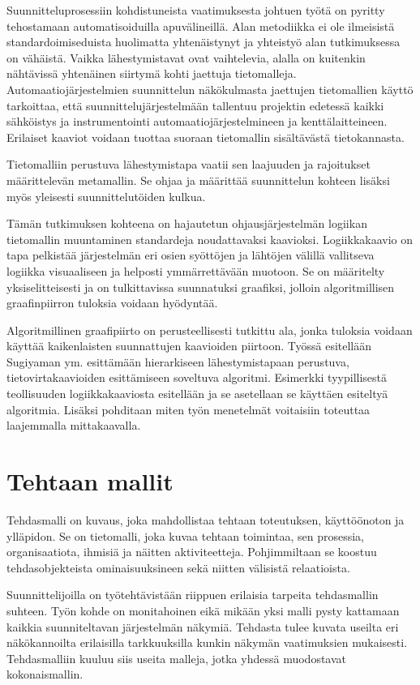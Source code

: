 \documentclass[finnish,12pt]{article}
\begin{document}
Suunnitteluprosessiin kohdistuneista vaatimuksesta johtuen työtä on pyritty tehostamaan automatisoiduilla apuvälineillä.
Alan metodiikka ei ole ilmeisistä standardoimiseduista huolimatta yhtenäistynyt ja yhteistyö alan tutkimuksessa on vähäistä.
Vaikka lähestymistavat ovat vaihtelevia, alalla on kuitenkin nähtävissä yhtenäinen siirtymä kohti jaettuja tietomalleja.
Automaatiojärjestelmien suunnittelun näkökulmasta jaettujen tietomallien käyttö tarkoittaa,
että suunnittelujärjestelmään tallentuu projektin edetessä kaikki sähköistys ja instrumentointi automaatiojärjestelmineen ja kenttälaitteineen.
Erilaiset kaaviot voidaan tuottaa suoraan tietomallin sisältävästä tietokannasta.

Tietomalliin perustuva lähestymistapa vaatii sen laajuuden ja rajoitukset määrittelevän metamallin.
Se ohjaa ja määrittää suunnittelun kohteen lisäksi myös yleisesti suunnittelutöiden kulkua.

Tämän tutkimuksen kohteena on hajautetun ohjausjärjestelmän logiikan tietomallin muuntaminen standardeja noudattavaksi kaavioksi.
Logiikkakaavio on tapa pelkistää järjestelmän eri osien syöttöjen ja lähtöjen välillä vallitseva logiikka visuaaliseen ja helposti ymmärrettävään muotoon.
Se on määritelty yksiselitteisesti ja on tulkittavissa suunnatuksi graafiksi, jolloin algoritmillisen graafinpiirron tuloksia voidaan hyödyntää.

Algoritmillinen graafipiirto on perusteellisesti tutkittu ala, jonka tuloksia voidaan käyttää kaikenlaisten suunnattujen kaavioiden piirtoon.
Työssä esitellään Sugiyaman ym. \cite{RefWorks:9} esittämään hierarkiseen lähestymistapaan perustuva, tietovirtakaavioiden esittämiseen soveltuva algoritmi.
Esimerkki tyypillisestä teollisuuden logiikkakaaviosta esitellään ja se asetellaan se käyttäen esiteltyä algoritmia.
Lisäksi pohditaan miten työn menetelmät voitaisiin toteuttaa laajemmalla mittakaavalla.

	\clearpage
	\section{Tehtaan mallit}

Tehdasmalli on kuvaus, joka mahdollistaa tehtaan toteutuksen, käyttöönoton ja ylläpidon.
Se on tietomalli, joka kuvaa tehtaan toimintaa, sen prosessia, organisaatiota, ihmisiä ja näitten aktiviteetteja.
Pohjimmiltaan se koostuu tehdasobjekteista ominaisuuksineen sekä niitten välisistä relaatioista. \cite{RefWorks:41}

Suunnittelijoilla on työtehtävistään riippuen erilaisia tarpeita tehdasmallin suhteen.
Työn kohde on monitahoinen eikä mikään yksi malli pysty kattamaan kaikkia suunniteltavan järjestelmän näkymiä.
Tehdasta tulee kuvata useilta eri näkökannoilta erilaisilla tarkkuuksilla kunkin näkymän vaatimuksien mukaisesti.
Tehdasmalliin kuuluu siis useita malleja, jotka yhdessä muodostavat kokonaismallin.
\end{document}

